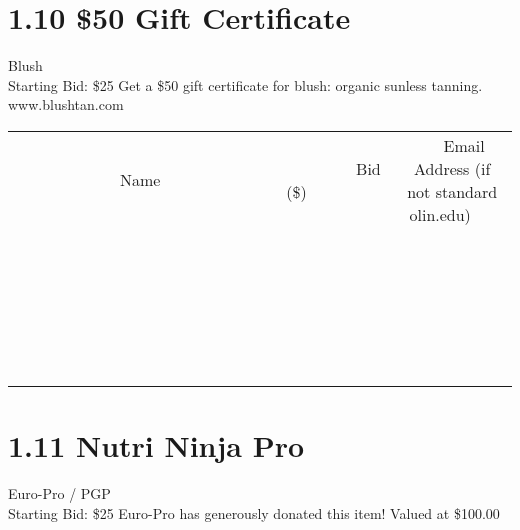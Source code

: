\documentclass[11pt]{article}
\begin{document}
\section*{1.10 \$50 Gift Certificate}
Blush
\\
Starting Bid: \$25
\newline
Get a \$50 gift certificate for blush: organic sunless tanning.
www.blushtan.com
\\[6ex]
\begin{tabular}{c c c}
~~~~~~~~~~~~~Name~~~~~~~~~~~~~ & ~~~~~~~~~Bid (\$)~~~~~~~~~  & ~~~Email Address (if not standard olin.edu)~~~\\
 & & \\
\hline
 & & \\
\hline
 & & \\
\hline
 & & \\
\hline
 & & \\
\hline
 & & \\
\hline
 & & \\
\hline
 & & \\
\hline
 & & \\
\hline
 & & \\
\hline
 & & \\
\hline
 & & \\
\hline
 & & \\
\hline
 & & \\
\hline
 & & \\
\hline
 & & \\
\hline
 & & \\
\hline
 & & \\
\hline
 & & \\
\hline
 & & \\
\hline
 & & \\
\hline
 & & \\
\hline
 & & \\
\hline
 & & \\
\hline
 & & \\
\hline
 & & \\
\hline
\end{tabular}
\newpage
\section*{1.11 Nutri Ninja Pro}
Euro-Pro / PGP
\\
Starting Bid: \$25
\newline
Euro-Pro has generously donated this item! Valued at \$100.00
\end{document}
